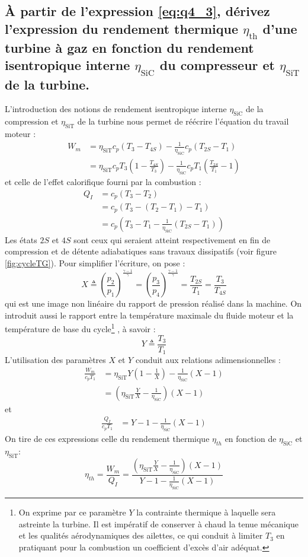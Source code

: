 \newcommand{\sit}{\eta_\text{SiT}}
\newcommand{\sic}{\eta_\text{SiC}}
\subsection{À partir de l'expression \ref{eq:q4_3}, dérivez l'expression du rendement thermique $\eta_\text{th}$ d'une turbine à gaz en fonction du rendement isentropique interne $\sic$ du compresseur et $\sit$ de la turbine.} 
L'introduction des notions de rendement isentropique interne $\sic$ de la compression et $\sit$ de la turbine nous permet de réécrire l'équation du travail moteur :
\begin{align} W_m &= \sit c_p(T_3-T_{4S})-\frac{1}{\sic}c_p(T_{2S}-T_1) \\ &= \sit c_pT_3\left(1-\frac{T_{4S}}{T_3}\right)-\frac{1}{\sic}c_pT_1\left(\frac{T_{2S}}{T_1}-1\right)\end{align}
et celle de l'effet calorifique fourni par la combustion :
\begin{align} Q_I &= c_p(T_3-T_2) \\ &= c_p(T_3-(T_2-T_1)-T_1) \\ &= c_p\left(T_3-T_1-\frac{1}{\sic}(T_{2S}-T_1)\right) \end{align}
Les états $2S$ et $4S$ sont ceux qui seraient atteint respectivement en fin de compression et de détente adiabatiques sans travaux dissipatifs (voir figure \ref{fig:cycleTG}). Pour simplifier l'écriture, on pose :
\begin{equation} X \triangleq \left(\frac{p_2}{p_1}\right)^{\frac{\gamma-1}{\gamma}} = \left(\frac{p_3}{p_4}\right)^{\frac{\gamma-1}{\gamma}} = \frac{T_{2S}}{T_1} = \frac{T_3}{T_{4S}} \label{eq:Xcomp}\end{equation}
qui est une image non linéaire du rapport de pression réalisé dans la machine. On introduit aussi le rapport entre la température maximale du fluide moteur et la température de base du cycle\footnote{On exprime par ce paramètre $Y$ la contrainte thermique à laquelle sera astreinte la turbine. Il est impératif de conserver à chaud la tenue mécanique et les qualités aérodynamiques des ailettes, ce qui conduit à limiter $T_3$ en pratiquant pour la combustion un coefficient d'excès d'air adéquat.} , à savoir :
\begin{equation} Y \triangleq \frac{T_3}{T_1} \label{eq:Ytemp}\end{equation} 
L'utilisation des paramètres $X$ et $Y$ conduit aux relations adimensionnelles :
\begin{align} \frac{W_m}{c_pT_1} &= \sit Y\left(1-\frac{1}{X}\right) - \frac{1}{\sic}\left(X-1\right) \\ &= \left(\sit\frac{Y}{X}-\frac{1}{\sic}\right)(X-1) \end{align}
et 
\begin{align} \frac{Q_I}{c_pT_1} &= Y - 1 - \frac{1}{\sic}(X-1) \end{align} 
On tire de ces expressions celle du rendement thermique $\eta_{th}$ en fonction de $\sic$ et $\sit$:
\begin{equation} \eta_{th} = \frac{W_m}{Q_I} = \frac{\left(\sit\frac{Y}{X}-\frac{1}{\sic}\right)(X-1)}{Y - 1 - \frac{1}{\sic}(X-1)} \end{equation}

